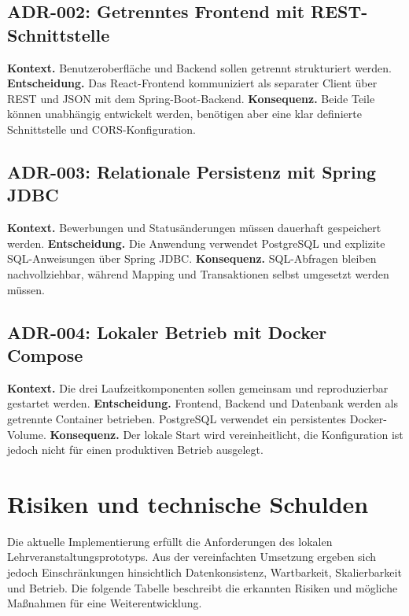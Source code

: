 \documentclass[a4paper,11pt]{article}
\begin{document}
\subsection{ADR-002: Getrenntes Frontend mit REST-Schnittstelle}

\textbf{Kontext.}
Benutzeroberfläche und Backend sollen getrennt strukturiert werden.
\textbf{Entscheidung.}
Das React-Frontend kommuniziert als separater Client über REST und JSON mit dem Spring-Boot-Backend.
\textbf{Konsequenz.}
Beide Teile können unabhängig entwickelt werden, benötigen aber eine klar definierte Schnittstelle und CORS-Konfiguration.


\subsection{ADR-003: Relationale Persistenz mit Spring JDBC}

\textbf{Kontext.}
Bewerbungen und Statusänderungen müssen dauerhaft gespeichert werden.
\textbf{Entscheidung.}
Die Anwendung verwendet PostgreSQL und explizite SQL-Anweisungen über Spring JDBC.
\textbf{Konsequenz.}
SQL-Abfragen bleiben nachvollziehbar, während Mapping und Transaktionen selbst umgesetzt werden müssen.


\subsection{ADR-004: Lokaler Betrieb mit Docker Compose}

\textbf{Kontext.}
Die drei Laufzeitkomponenten sollen gemeinsam und reproduzierbar gestartet werden.
\textbf{Entscheidung.}
Frontend, Backend und Datenbank werden als getrennte Container betrieben.
PostgreSQL verwendet ein persistentes Docker-Volume.
\textbf{Konsequenz.}
Der lokale Start wird vereinheitlicht, die Konfiguration ist jedoch nicht für einen produktiven Betrieb ausgelegt.






\newpage
\section{Risiken und technische Schulden}
\label{sec:risks}

Die aktuelle Implementierung erfüllt die Anforderungen des lokalen Lehrveranstaltungsprototyps.
Aus der vereinfachten Umsetzung ergeben sich jedoch Einschränkungen hinsichtlich Datenkonsistenz, Wartbarkeit, Skalierbarkeit und Betrieb.
Die folgende Tabelle beschreibt die erkannten Risiken und mögliche Maßnahmen für eine Weiterentwicklung.
\end{document}
